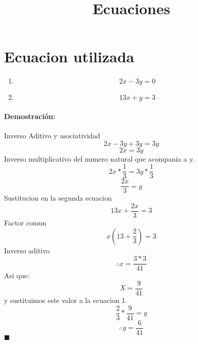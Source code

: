 \documentclass[letterpaper]{article}
\title{Ecuaciones}
\author{}
\date{\displaydate{date}}
\begin{document}
\maketitle
\thispagestyle{fancy}
\section{Ecuacion utilizada}

\begin{enumerate}
    \item $$2x-3y =0 $$
    \item  $$13x+y = 3$$
\end{enumerate}
    \def\proof{\paragraph{Demostración: \\}}
    \def\endproof{\hfill$\blacksquare$}
    \begin{proof}
    
        Inverso Aditivo y asociatividad$$2x-3y+3y = 3y$$
        $$2x = 3y$$
        Inverso multiplicativo del numero natural que acompania a y. $$2x * \frac{1}{3} = 3y * \frac{1}{3}$$
        $$\frac{2x}{3} = y$$
        Sustitucion en la segunda ecuacion $$13x + \frac{2x}{3}  = 3 $$ 
        Factor comun$$x(13+\frac{2}{3})=3$$ 
        Inverso aditivo $$\therefore x = \frac{3*3}{41}$$
        Asi que: $$X = \frac{9}{41}$$
        y sustituimos este valor a la ecuacion 1. $$\frac{2}{3}*\frac{9}{41} = y$$
        $$\therefore y =\frac{6}{41}$$
    \end{proof}
\end{document}
